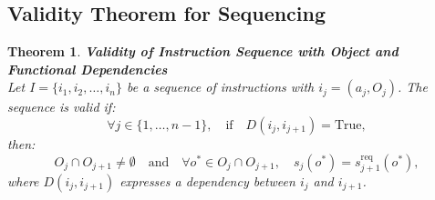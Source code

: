 \documentclass[a4paper,11pt]{lmcs}
\newtheorem{theorem}{Theorem}
\begin{document}
\subsection{Validity Theorem for Sequencing}
\begin{theorem}
\label{th:validity}
\textbf{Validity of Instruction Sequence with Object and Functional Dependencies} \\
Let \( I = \{i_1, i_2, \ldots, i_n\} \) be a sequence of instructions with \( i_j = (a_j, O_j) \). The sequence is valid if:
\[
\forall j \in \{1, \ldots, n-1\}, \quad \text{if} \quad D(i_j, i_{j+1}) = \text{True},
\]
then:
\[
O_j \cap O_{j+1} \neq \emptyset \quad \text{and} \quad
\forall o^* \in O_j \cap O_{j+1}, \quad s_j(o^*) = s_{j+1}^{\mathrm{req}}(o^*),
\]
where \( D(i_j, i_{j+1}) \) expresses a dependency between \( i_j \) and \( i_{j+1} \).
\end{theorem}
\end{document}
